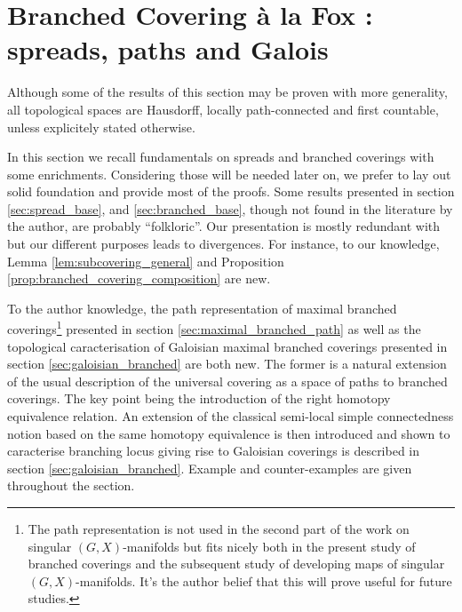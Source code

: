 % 







\section{Branched Covering à la  Fox : spreads, paths and Galois}

Although some of the results of this section may be proven with more generality, all topological spaces are Hausdorff, locally path-connected and first countable, unless explicitely stated otherwise.

In this section we recall fundamentals on spreads and branched coverings with some enrichments. Considering those will be needed later on, we prefer to lay out solid foundation and provide most of the proofs. Some results presented in section \ref{sec:spread_base}, and \ref{sec:branched_base}, though not found in the literature by the author, are probably ``folkloric''. Our presentation is mostly redundant with \cite{MR3060537,MR3309706,MR2599123,MR2198590} but our different purposes leads to divergences. For instance, to our knowledge, Lemma \ref{lem:subcovering_general} and Proposition \ref{prop:branched_covering_composition} are new.


To the author knowledge, the path representation of maximal branched coverings\footnote{The path representation is not used in the second part  of the work on singular $(G,X)$-manifolds but fits nicely both in the present study of branched coverings and the subsequent study of developing maps of singular $(G,X)$-manifolds. It's the author belief that this will prove useful for future studies.} presented in section \ref{sec:maximal_branched_path} as well as the topological caracterisation of Galoisian maximal branched coverings presented in section \ref{sec:galoisian_branched} are both new. The former is a natural extension of the usual description of the universal covering as a space of paths to branched coverings. The key point being the introduction of the right homotopy equivalence relation. An extension of the classical semi-local simple connectedness notion based on the same homotopy equivalence is then introduced and shown to caracterise branching locus giving rise to Galoisian coverings is described  in section \ref{sec:galoisian_branched}. Example and counter-examples are given throughout the section.

